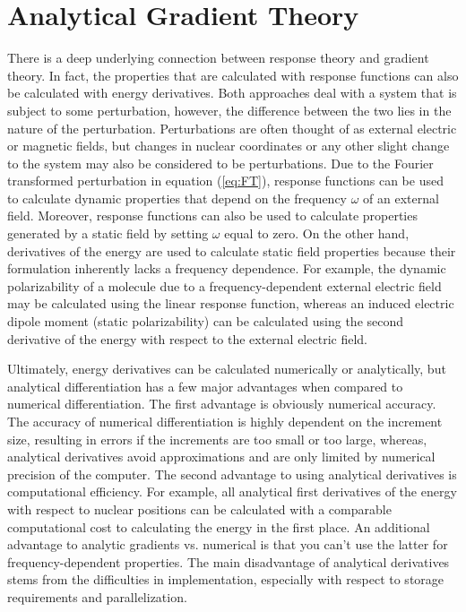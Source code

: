 
\section{Analytical Gradient Theory}
    There is a deep underlying connection between response theory and gradient theory. In fact, the properties that are calculated with response functions can also be calculated with energy derivatives. Both approaches deal with a system that is subject to some perturbation, however, the difference between the two lies in the nature of the perturbation. Perturbations are often thought of as external electric or magnetic fields, but changes in nuclear coordinates or any other slight change to the system may also be considered to be perturbations. Due to the Fourier transformed perturbation in equation (\ref{eq:FT}), response functions can be used to calculate dynamic properties that depend on the frequency $\omega$ of an external field. Moreover, response functions can also be used to calculate properties generated by a static field by setting $\omega$ equal to zero. On the other hand, derivatives of the energy are used to calculate static field properties because their formulation inherently lacks a frequency dependence. For example, the dynamic polarizability of a molecule due to a frequency-dependent external electric field may be calculated using the linear response function, whereas an induced electric dipole moment (static polarizability) can be calculated using the second derivative of the energy with respect to the external electric field.

    Ultimately, energy derivatives can be calculated numerically or analytically, but analytical differentiation has a few major advantages when compared to numerical differentiation. The first advantage is obviously numerical accuracy. The accuracy of numerical differentiation is highly dependent on the increment size, resulting in errors if the increments are too small or too large, whereas, analytical derivatives avoid approximations and are only limited by numerical precision of the computer. The second advantage to using analytical derivatives is computational efficiency. For example, all analytical first derivatives of the energy with respect to nuclear positions can be calculated with a comparable computational cost to calculating the energy in the first place. An additional advantage to analytic gradients vs. numerical is that you can't use the latter for frequency-dependent properties. The main disadvantage of analytical derivatives stems from the difficulties in implementation, especially with respect to storage requirements and parallelization\cite{Pulay2014}.
